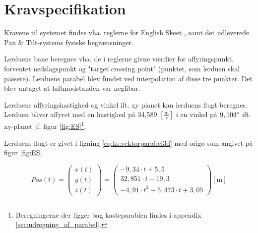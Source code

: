 \section{Kravspecifikation}
\label{sec:kravspecifikation}
Kravene til systemet findes vha. reglerne for English Skeet \citep{ES_regler},
samt det udleverede Pan \& Tilt-systems fysiske begrænsninger.


Lerduens bane beregnes vha. de i reglerne givne værdier for affyringspunkt, forventet nedslagspunkt
og "target crossing point" (punktet, som lerduen skal passere).
Lerduens parabel blev fundet ved interpolation af disse tre punkter. Det blev antaget at luftmodstanden var neglibar.

Lerduens affyringshastighed og vinkel ift. xy planet kan lerduens flugt beregnes. 
Lerduen bliver affyret med en hastighed på 34,589 \([\frac{m}{s}]\) i en vinkel på \(9,103 \degree\) 
ift. xy-planet jf. figur \ref{fig:ES}\footnote{Beregningerne der ligger bag kasteparablen findes i appendix \ref{sec:udregning_af_parabel}.}. 

Lerduens flugt er givet i ligning \ref{eq:ks:vektorparabel3d} med origo som angivet på figur \ref{fig:ES}. 

\begin{equation}
Pos\left( t \right) = 
\left( \begin{matrix} 
	x\left( t \right)  \\ 
	y\left( t \right)  \\ 
	z\left( t \right)  \end{matrix} \right) =
	 \left( \begin{matrix} 
	- 9,34\cdot t+5,5 \\
  32,851\cdot t-19,3 \\ 
 -{ 4,91\cdot t }^{ 2 }+5,473\cdot t+3,05\end{matrix} \right) [\text{m}]
\label{eq:ks:vektorparabel3d}
\end{equation}

